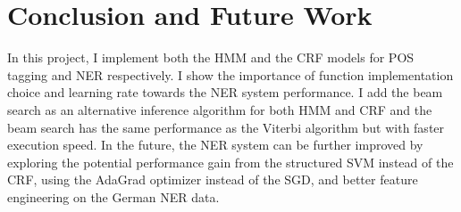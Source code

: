 \documentclass[11pt,a4paper]{article}
\begin{document}
\section{Conclusion and Future Work}

In this project, I implement both the HMM and the CRF models for POS tagging and NER respectively. I
show the importance of function implementation choice and learning rate towards
the NER system performance. I add the beam search as 
an alternative inference algorithm for both HMM and CRF and the beam search
has the same performance as the Viterbi algorithm but with faster execution speed. 
In the future, the NER system can be further improved by exploring the potential performance gain
from the structured SVM instead of the CRF, using the AdaGrad optimizer instead of the SGD, and 
better feature engineering on the German NER data.



\end{document}
